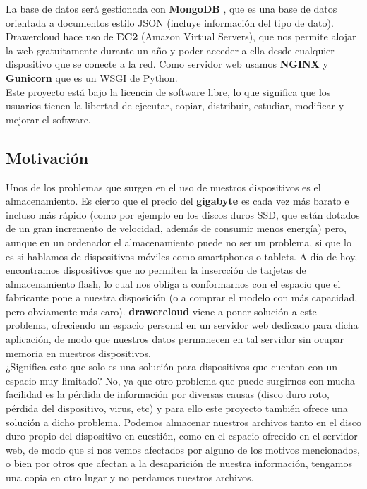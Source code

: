 La base de datos será gestionada con \textbf{MongoDB} \cite{cita9}, que es una base de datos orientada a documentos estilo JSON (incluye información del tipo de dato). \\

Drawercloud hace uso de \textbf{EC2} \cite{cita_ec2} (Amazon Virtual Servers), que nos permite alojar la web gratuitamente durante un año y poder acceder a ella desde cualquier dispositivo que se conecte a la red. Como servidor web usamos \textbf{NGINX} \cite{cita_nginx} y \textbf{Gunicorn} \cite{cita_gunicorn} que es un WSGI de Python.\\

Este proyecto está bajo la licencia de software libre, lo que significa que los usuarios tienen la libertad de ejecutar, copiar, distribuir, estudiar, modificar y mejorar el software.

\subsection{Motivación}

Unos de los problemas que surgen en el uso de nuestros dispositivos es el almacenamiento. Es cierto que el precio del \textbf{gigabyte} es cada vez más barato e incluso más rápido (como por ejemplo en los discos duros SSD, que están dotados de un gran incremento de velocidad, además de consumir menos energía) pero, aunque en un ordenador el almacenamiento puede no ser un problema, si que lo es si hablamos de dispositivos móviles como smartphones o tablets. A día de hoy, encontramos dispositivos que no permiten la insercción de tarjetas de almacenamiento flash, lo cual nos obliga a conformarnos con el espacio que el fabricante pone a nuestra disposición (o a comprar el modelo con más capacidad, pero obviamente más caro). \textbf{drawercloud} viene a poner solución a este problema, ofreciendo un espacio personal en un servidor web dedicado para dicha aplicación, de modo que nuestros datos permanecen en tal servidor sin ocupar memoria en nuestros dispositivos. \\

¿Significa esto que solo es una solución para dispositivos que cuentan con un espacio muy limitado? No, ya que otro problema que puede surgirnos con mucha facilidad es la pérdida de información por diversas causas (disco duro roto, pérdida del dispositivo, virus, etc) y para ello este proyecto también ofrece una solución a dicho problema. Podemos almacenar nuestros archivos tanto en el disco duro propio del dispositivo en cuestión, como en el espacio ofrecido en el servidor web, de modo que si nos vemos afectados por alguno de los motivos mencionados, o bien por otros que afectan a la desaparición de nuestra información, tengamos una copia en otro lugar y no perdamos nuestros archivos. \\

